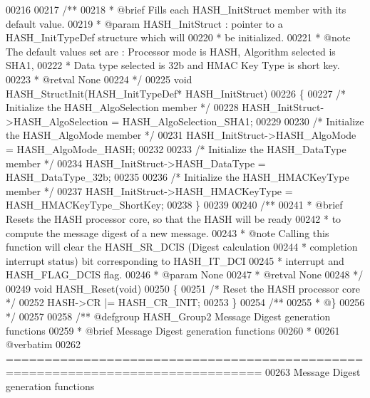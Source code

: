 \begin{DoxyCode}
00216 
00217 \textcolor{comment}{/**}
00218 \textcolor{comment}{  * @brief  Fills each HASH\_InitStruct member with its default value.}
00219 \textcolor{comment}{  * @param  HASH\_InitStruct : pointer to a HASH\_InitTypeDef structure which will}
00220 \textcolor{comment}{  *          be initialized.  }
00221 \textcolor{comment}{  *  @note  The default values set are : Processor mode is HASH, Algorithm selected is SHA1,}
00222 \textcolor{comment}{  *          Data type selected is 32b and HMAC Key Type is short key.  }
00223 \textcolor{comment}{  * @retval None}
00224 \textcolor{comment}{  */}
00225 \textcolor{keywordtype}{void} HASH_StructInit(HASH\_InitTypeDef* HASH\_InitStruct)
00226 \{
00227   \textcolor{comment}{/* Initialize the HASH\_AlgoSelection member */}
00228   HASH\_InitStruct->HASH_AlgoSelection = HASH_AlgoSelection_SHA1;
00229 
00230   \textcolor{comment}{/* Initialize the HASH\_AlgoMode member */}
00231   HASH\_InitStruct->HASH_AlgoMode = HASH_AlgoMode_HASH;
00232 
00233   \textcolor{comment}{/* Initialize the HASH\_DataType member */}
00234   HASH\_InitStruct->HASH_DataType = HASH_DataType_32b;
00235 
00236   \textcolor{comment}{/* Initialize the HASH\_HMACKeyType member */}
00237   HASH\_InitStruct->HASH_HMACKeyType = HASH_HMACKeyType_ShortKey;
00238 \}
00239 
00240 \textcolor{comment}{/**}
00241 \textcolor{comment}{  * @brief  Resets the HASH processor core, so that the HASH will be ready}
00242 \textcolor{comment}{  *         to compute the message digest of a new message.}
00243 \textcolor{comment}{  * @note   Calling this function will clear the HASH\_SR\_DCIS (Digest calculation }
00244 \textcolor{comment}{  *         completion interrupt status) bit corresponding to HASH\_IT\_DCI }
00245 \textcolor{comment}{  *         interrupt and HASH\_FLAG\_DCIS flag. }
00246 \textcolor{comment}{  * @param  None}
00247 \textcolor{comment}{  * @retval None}
00248 \textcolor{comment}{  */}
00249 \textcolor{keywordtype}{void} HASH_Reset(\textcolor{keywordtype}{void})
00250 \{
00251   \textcolor{comment}{/* Reset the HASH processor core */}
00252   HASH->CR |= HASH_CR_INIT;
00253 \}
00254 \textcolor{comment}{/**}
00255 \textcolor{comment}{  * @\}}
00256 \textcolor{comment}{  */}
00257 
00258 \textcolor{comment}{/** @defgroup HASH\_Group2 Message Digest generation functions}
00259 \textcolor{comment}{ *  @brief    Message Digest generation functions}
00260 \textcolor{comment}{ *}
00261 \textcolor{comment}{@verbatim    }
00262 \textcolor{comment}{ ===============================================================================}
00263 \textcolor{comment}{                      Message Digest generation functions}

\end{DoxyCode}
